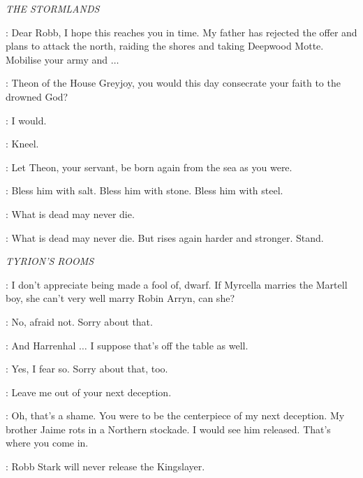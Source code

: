 \textit{THE STORMLANDS} 


\THEON: Dear Robb, I hope this reaches you in time. My father has rejected the offer and plans to attack the north, raiding the shores and taking Deepwood Motte. Mobilise your army and $\ldots$ 



\DROWNEDPRIEST: Theon of the House Greyjoy, you would this day consecrate your faith to the drowned God? 

\THEON: I would. 

\DROWNEDPRIEST: Kneel. 


\DROWNEDPRIEST: Let Theon, your servant, be born again from the sea as you were. 


\DROWNEDPRIEST: Bless him with salt. Bless him with stone. Bless him with steel. 

\THEON: What is dead may never die. 

\DROWNEDPRIEST: What is dead may never die. But rises again harder and stronger. Stand. 


\scene

\textit{TYRION'S ROOMS} 

\LITTLEFINGER: I don't appreciate being made a fool of, dwarf. If Myrcella marries the Martell boy, she can't very well marry Robin Arryn, can she? 

\TYRION: No, afraid not. Sorry about that. 

\LITTLEFINGER: And Harrenhal $\ldots$ I suppose that's off the table as well. 

\TYRION: Yes, I fear so. Sorry about that, too. 

\LITTLEFINGER: Leave me out of your next deception. 

\TYRION: Oh, that's a shame. You were to be the centerpiece of my next deception. My brother Jaime rots in a Northern stockade. I would see him released. That's where you come in. 

\LITTLEFINGER: Robb Stark will never release the Kingslayer. 

